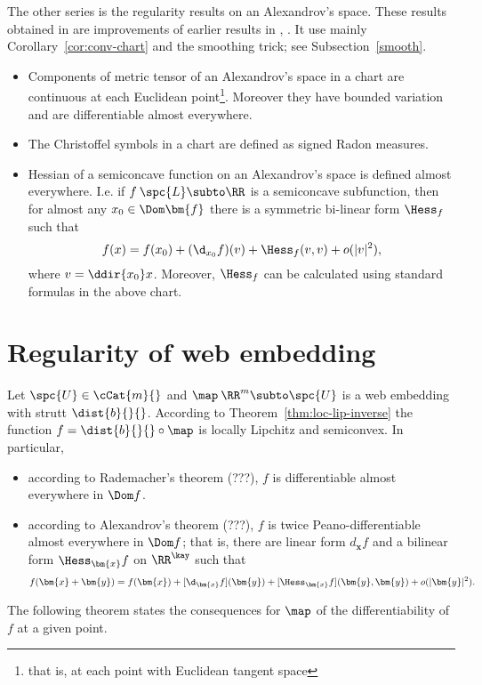 The other series is the regularity results on an Alexandrov's space. 
These results obtained in \cite{perelman:DC} are improvements of earlier results in \cite{otsu-shioya}, \cite{otsu:second-der}. 
It use mainly
Corollary~\ref{cor:conv-chart} and the smoothing trick; see Subsection~\ref{smooth}. 
\begin{itemize}
\item Components of metric tensor of an Alexandrov's space in a chart are continuous
at each Euclidean point\footnote{that is, at each point with Euclidean tangent
space}. 
Moreover they have bounded variation and are differentiable almost everywhere.
\item The Christoffel symbols  in a chart are defined as signed Radon measures.
\item Hessian of a semiconcave function on an Alexandrov's space is defined almost
everywhere. I.e. if $f\:\spc{L}\subto\RR$ is a semiconcave subfunction, then for almost
any $x_0\in \Dom\bm{f}$ there is a symmetric bi-linear form $\Hess_f$ such that
\[f(x)=f(x_0)+(\d_{x_0}f)(v)+\Hess_f(v,v)+o(|v|^2),\]
where $v=\ddir{x_0}x$. 
Moreover, $\Hess_f$ can be calculated using  standard formulas in the above
chart.
\end{itemize}








\section{Regularity of web embedding}\label{sec:web-embedding}

Let $\spc{U}\in\cCat{m}{}$ 
and $\map\:\RR^m\subto \spc{U}$ is a web embedding with strutt
$\dist{b}{}{}$.
According to Theorem~\ref{thm:loc-lip-inverse} the function $f=\dist{b}{}{}\circ\map$ is locally Lipchitz and semiconvex.
In particular, 
\begin{itemize}
\item according to Rademacher's theorem (???), $f$ is differentiable almost everywhere in $\Dom f$.
\item according to Alexandrov's theorem (???), 
$f$ is twice Peano-differentiable almost everywhere in $\Dom f$;
that is, there are 
linear form $d_{\bm{x}}f$ 
and a bilinear form $\Hess_{\bm{x}}f$ 
on $\RR^\kay$ 
such that
\[f(\bm{x}+\bm{y})
=
f(\bm{x})+[\d_{\bm{x}}f](\bm{y})+[\Hess_{\bm{x}}f](\bm{y},\bm{y})
+o(|\bm{y}|^2).\] 
\end{itemize}
The following theorem states the consequences for $\map$ 
of the differentiability of $f$ at a given point. 



